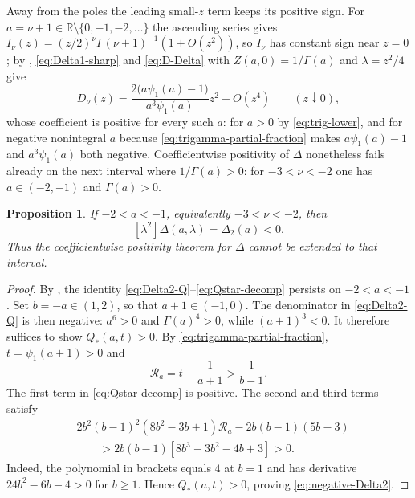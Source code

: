 \documentclass[11pt,a4paper]{amsart}
\numberwithin{equation}{section}
\theoremstyle{plain}
\newtheorem{proposition}[theorem]{Proposition}
\theoremstyle{definition}
\newcommand{\R}{\mathbb R}
\begin{document}
Away from the poles the leading small-\(z\) term keeps its positive sign.  For
\(a=\nu+1\in\R\setminus\{0,-1,-2,\ldots\}\) the ascending series gives
\(I_\nu(z)=(z/2)^\nu\Gamma(\nu+1)^{-1}(1+O(z^2))\), so \(I_\nu\) has constant sign
near \(z=0\); by , \eqref{eq:Delta1-sharp} and
\eqref{eq:D-Delta} with \(Z(a,0)=1/\Gamma(a)\) and \(\lambda=z^2/4\) give
\begin{equation}\label{eq:small-z-D}
 D_\nu(z)=\frac{2\bigl(a\psi_1(a)-1\bigr)}{a^3\psi_1(a)}z^2+O(z^4)
 \qquad(z\downarrow0),
\end{equation}
whose coefficient is positive for every such \(a\): for \(a>0\) by
\eqref{eq:trig-lower}, and for negative nonintegral \(a\) because
\eqref{eq:trigamma-partial-fraction} makes \(a\psi_1(a)-1\) and \(a^3\psi_1(a)\) both
negative.  Coefficientwise positivity of \(\Delta\) nonetheless fails already on
the next interval where \(1/\Gamma(a)>0\): for \(-3<\nu<-2\) one has
\(a\in(-2,-1)\) and \(\Gamma(a)>0\).

\begin{proposition}\label{prop:negative-coeff-failure}
If \(-2<a<-1\), equivalently \(-3<\nu<-2\), then
\begin{equation}\label{eq:negative-Delta2}
 [\lambda^2]\Delta(a,\lambda)=\Delta_2(a)<0.
\end{equation}
Thus the coefficientwise positivity theorem for \(\Delta\) cannot be extended to
that interval.
\end{proposition}

\begin{proof}
By , the identity \eqref{eq:Delta2-Q}--\eqref{eq:Qstar-decomp} persists on \(-2<a<-1\).  Set \(b=-a\in(1,2)\), so that \(a+1\in(-1,0)\).  The denominator in \eqref{eq:Delta2-Q} is then negative: \(a^6>0\) and \(\Gamma(a)^4>0\), while \((a+1)^3<0\).  It therefore suffices to show \(Q_*(a,t)>0\).  By \eqref{eq:trigamma-partial-fraction}, \(t=\psi_1(a+1)>0\) and
\[
 \mathcal R_a=t-\frac1{a+1}>\frac1{b-1}.
\]
The first term in \eqref{eq:Qstar-decomp} is positive.  The second and third terms satisfy
\begin{align*}
 &2b^2(b-1)^2(8b^2-3b+1)\mathcal R_a
 -2b(b-1)(5b-3)\\
 &\qquad>
 2b(b-1)\left[8b^3-3b^2-4b+3\right]>0.
\end{align*}
Indeed, the polynomial in brackets equals \(4\) at \(b=1\) and has derivative \(24b^2-6b-4>0\) for \(b\ge1\).  Hence \(Q_*(a,t)>0\), proving \eqref{eq:negative-Delta2}.
\end{proof}
\end{document}
